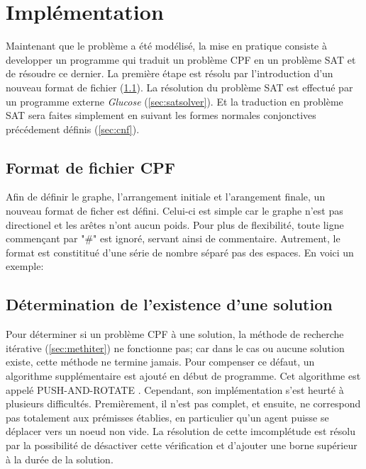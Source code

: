 \documentclass[french, 10pt, letterpaper]{article}
\theoremstyle{definition}
\theoremstyle{proposition}
\theoremstyle{example}
\begin{document}
    \newpage
    \section{Implémentation}

    Maintenant que le problème a été modélisé, la mise en pratique consiste à developper un programme qui traduit un problème CPF en 
    un problème SAT et de résoudre ce dernier.
    La première étape est résolu par l'introduction d'un nouveau format de fichier (\ref{sec:filecpf}).
    La résolution du problème SAT est effectué par un programme externe \emph{Glucose} (\ref{sec:satsolver}). 
    Et la traduction en problème SAT sera faites simplement en suivant les formes normales conjonctives précédement définis (\ref{sec:cnf}). 

    \subsection{Format de fichier CPF}
    \label{sec:filecpf}

    Afin de définir le graphe, l'arrangement initiale et l'arangement finale, un nouveau format de ficher est défini.
    Celui-ci est simple car le graphe n'est pas directionel et les arêtes n'ont aucun poids.
    Pour plus de flexibilité, toute ligne commençant par "\#" est ignoré, servant ainsi de commentaire. 
    Autrement, le format est constititué d'une série de nombre séparé pas des espaces. 
    En voici un exemple:
    
    
        
    \subsection{Détermination de l'existence d'une solution}
    \label{sec:par}

    Pour déterminer si un problème CPF à une solution, la méthode de recherche itérative (\ref{sec:methiter}) ne fonctionne pas;
    car dans le cas ou aucune solution existe, cette méthode ne termine jamais.
    Pour compenser ce défaut, un algorithme supplémentaire est ajouté en début de programme.
    Cet algorithme est appelé PUSH-AND-ROTATE \cite{WILDEPAR}. 
    Cependant, son implémentation s'est heurté à plusieurs difficultés. 
    Premièrement, il n'est pas complet, et ensuite, ne correspond pas totalement aux prémisses établies, en particulier 
    qu'un agent puisse se déplacer vers un noeud non vide.
    La résolution de cette imcomplétude est résolu par la possibilité de désactiver cette vérification et d'ajouter une borne 
    supérieur à la durée de la solution.
\end{document}
